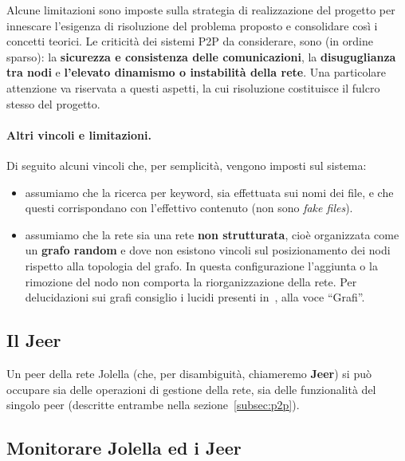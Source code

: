 Alcune limitazioni sono imposte sulla strategia di realizzazione del progetto
per innescare l'esigenza di risoluzione del problema proposto e consolidare così
i concetti teorici. Le criticità dei sistemi P2P da considerare, sono (in ordine
sparso): la \textbf{sicurezza e consistenza delle comunicazioni}, la
\textbf{disuguglianza tra nodi} e \textbf{l'elevato dinamismo o instabilità
 della rete}. Una particolare attenzione va riservata a questi aspetti, la cui
risoluzione costituisce il fulcro stesso del progetto.

\paragraph{Altri vincoli e limitazioni.} Di seguito alcuni vincoli che, per
semplicità, vengono imposti sul sistema:

\begin{itemize}

 \item assumiamo che la ricerca per keyword, sia effettuata sui
       nomi dei file, e che questi corrispondano con l'effettivo contenuto
       (non sono \textit{fake files}).

 \item assumiamo che la rete sia una rete \textbf{non strutturata}, cioè
       organizzata come un \textbf{grafo random} e dove non esistono vincoli sul
       posizionamento dei nodi rispetto alla topologia del grafo. In questa
       configurazione l'aggiunta o la rimozione del nodo non comporta la
       riorganizzazione della rete. Per delucidazioni sui grafi consiglio i lucidi presenti in~\cite{grafi}, alla voce ``Grafi''.

\end{itemize}

\subsection{Il Jeer}
\label{subsec:jeer}

Un peer della rete Jolella (che, per disambiguità, chiameremo \textbf{Jeer}) si
può occupare sia delle operazioni di gestione della rete, sia delle funzionalità
del singolo peer (descritte entrambe nella sezione~\ref{subsec:p2p}).

\subsection{Monitorare Jolella ed i Jeer}

